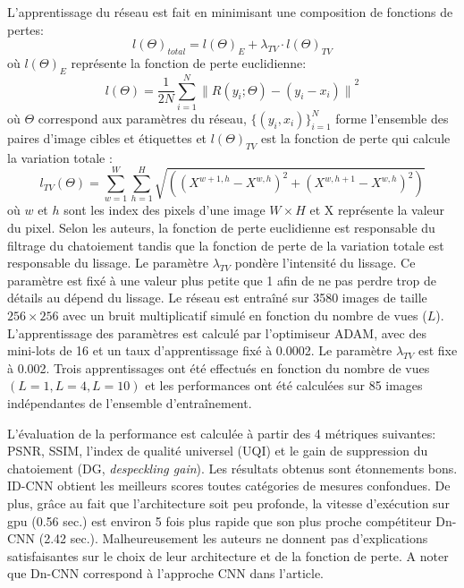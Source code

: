 L'apprentissage du réseau est fait en minimisant une composition de fonctions de pertes:
\begin{equation}
    l(\Theta)_{total} = l(\Theta)_E + \lambda_{TV} \cdot l(\Theta)_{TV}
\end{equation}
où $ l(\Theta)_E $ représente la fonction de perte euclidienne:
\begin{equation}
    l(\Theta)=\frac{1}{2N}\sum_{i=1}^{N}{\parallel R(y_i;\Theta) - (y_i-x_i)\parallel}^2
\end{equation}
où $\Theta$ correspond aux paramètres du réseau, $\{(y_i, x_i)\}_{i=1}^{N}$ forme l'ensemble des paires d'image cibles et étiquettes et $l(\Theta)_{TV}$ est la fonction de perte qui calcule la variation totale :
\begin{equation}
    l_{TV}(\Theta)=\sum_{w=1}^{W} \sum_{h=1}^{H} \sqrt{((X^{w+1, h}-X^{w, h})^2 + (X^{w, h+1}-X^{w, h})^2)}
\end{equation}
où $w$ et $h$ sont les index des pixels d'une image $W \times H$ et X représente la valeur du pixel. Selon les auteurs, la fonction de perte euclidienne est responsable du filtrage du chatoiement tandis que la fonction de perte de la variation totale est responsable du lissage.  Le paramètre $\lambda_{TV}$ pondère l'intensité du lissage.  Ce paramètre est fixé à une valeur plus petite que 1 afin de ne pas perdre trop de détails au dépend du lissage. Le réseau est entraîné sur 3580 images de taille $256 \times 256$ avec un bruit multiplicatif simulé en fonction du nombre de vues ($L$).  L'apprentissage des paramètres est calculé par l'optimiseur ADAM, avec des mini-lots de 16 et un taux d'apprentissage fixé à 0.0002. Le paramètre $\lambda_{TV}$ est fixe à 0.002.  Trois apprentissages ont été effectués en fonction du nombre de vues $(L=1, L=4, L=10)$ et les performances ont été calculées sur 85 images indépendantes de l'ensemble d'entraînement.

L'évaluation de la performance est calculée à partir des 4 métriques suivantes: PSNR, SSIM, l'index de qualité universel (UQI) et le gain de suppression du chatoiement (DG, \textit{despeckling gain}). Les résultats obtenus sont étonnements bons.  ID-CNN  obtient les meilleurs scores toutes catégories de mesures confondues.  De plus, grâce au fait que l'architecture soit peu profonde, la vitesse d'exécution sur gpu (0.56 sec.) est environ 5 fois plus rapide que son plus proche compétiteur Dn-CNN (2.42 sec.). Malheureusement les auteurs ne donnent pas d'explications satisfaisantes sur le choix de leur architecture et de la fonction de perte. A noter que Dn-CNN correspond à l'approche CNN dans l'article.

